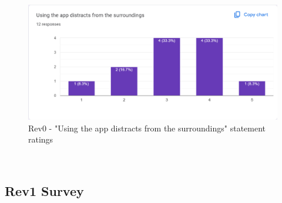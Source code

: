 \documentclass{article}
\begin{document}
\begin{figure}[H]
  \caption{Rev0 - "Using the app distracts from the surroundings" statement ratings}
  \centerline{\includegraphics[scale=0.35]{./Survey_Images/Rev0/Q6.png}}
  \label{fig:Enjoy}
\end{figure}

~\newpage

\subsection{Rev1 Survey}
\end{document}
